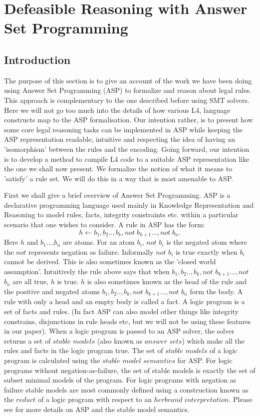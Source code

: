 \section{Defeasible Reasoning with Answer Set Programming}\label{sec:defeasible_asp}



\subsection{Introduction}
The purpose of this section is to give an account of the work we have been doing using Answer Set Programming (ASP) to formalize and reason about legal rules. This approach is complementary to the one described before using SMT solvers. Here we will not go too much into the details of how various L4, language constructs map to the ASP formalisation. Our intention rather, is to present how some core legal reasoning tasks can be implemented in ASP while keeping the ASP representation readable, intuitive and respecting the idea of having an 'isomorphism' between the rules and the encoding. Going forward, our intention is to develop a method to compile L4 code to a suitable ASP representation like the one we shall now present. We formalize the notion of what it means to 'satisfy' a rule set. We will do this in a way that is most amenable to ASP.

First we shall give a brief overview of Answer Set Programming. ASP is a declarative programming language used mainly in Knowledge Representation and Reasoning to model rules, facts, integrity constraints etc. within a particular scenario that one wishes to consider. A rule in ASP has the form:
\[h\leftarrow b_{1},b_{2}..,b_{k},not\; b_{k+1}...,not\; b_{n}.\]
Here $h$ and $b_{1}$...,$b_{n}$ are atoms. For an atom $b_{i}$, $not$ $b_{i}$ is the negated atom where the $not$ represents negation as failure. Informally $not$ $b_{i}$ is true exactly when $b_{i}$ cannot be derived. This is also sometimes known as the 'closed world assumption'. Intuitively the rule above says that when $b_{1},b_{2}..,b_{k},not$ $b_{k+1}...,not$ $b_{n}$ are all true, $h$ is true. $h$ is also sometimes known as the head of the rule and the positive and negated atoms $b_{1},b_{2}..,b_{k},not$ $b_{k+1}...,not$ $b_{n}$ form the body. A rule with only a head and an empty body is called a fact. A logic program is a set of facts and rules. (In fact ASP can also model other things like integrity constrains, disjunctions in rule heads etc, but we will not be using these features in our paper). When a logic program is passed to an ASP solver, the solver returns a set of $stable$ $models$ (also known as $answer$ $sets$) which make all the rules and facts in the logic program true. The set of $stable$ $models$ of a logic program is calculated using the $stable$ $model$ $semantics$ for ASP. For logic programs without negation-as-failure, the set of stable models is exactly the set of subset minimal models of the program. For logic programs with negation as failure stable models are most commonly defined using a construction known as the $reduct$ of a logic program with respect to an $herbrand$ $interpretation$. Please see \cite{asp_background} for more details on ASP and the stable model semantics.   

